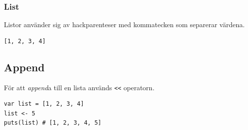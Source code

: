 \documentclass{TDP003mall}
\begin{document}
\subsubsection{List}
Listor använder sig av hackparenteser med kommatecken som separerar värdena.
\begin{verbatim}
[1, 2, 3, 4]
\end{verbatim}

\subsection{Append}
För att \textit{append}a till en lista används \texttt{<<} operatorn.
\begin{verbatim}
var list = [1, 2, 3, 4]
list <- 5
puts(list) # [1, 2, 3, 4, 5]
\end{verbatim}



% 
% 
\end{document}
